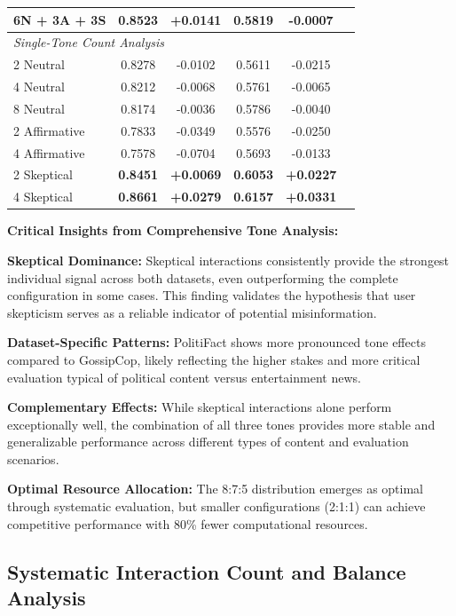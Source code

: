 \begin{table}[htbp]
\begin{tabular}{lccccc}
6N + 3A + 3S & 0.8523 & +0.0141 & 0.5819 & -0.0007 \\
\midrule
\multicolumn{5}{l}{\textit{Single-Tone Count Analysis}} \\
2 Neutral     & 0.8278 & -0.0102 & 0.5611 & -0.0215 \\
4 Neutral     & 0.8212 & -0.0068 & 0.5761 & -0.0065 \\
8 Neutral     & 0.8174 & -0.0036 & 0.5786 & -0.0040 \\ 
2 Affirmative & 0.7833 & -0.0349 & 0.5576 & -0.0250 \\
4 Affirmative & 0.7578 & -0.0704 & 0.5693 & -0.0133 \\
2 Skeptical   & \textbf{0.8451} & \textbf{+0.0069} & \textbf{0.6053} & \textbf{+0.0227} \\
4 Skeptical   & \textbf{0.8661} & \textbf{+0.0279} & \textbf{0.6157} & \textbf{+0.0331} \\
\bottomrule
\end{tabular}
\end{table}

\textbf{Critical Insights from Comprehensive Tone Analysis:}

\textbf{Skeptical Dominance:} Skeptical interactions consistently provide the strongest individual signal across both datasets, even outperforming the complete configuration in some cases. This finding validates the hypothesis that user skepticism serves as a reliable indicator of potential misinformation.

\textbf{Dataset-Specific Patterns:} PolitiFact shows more pronounced tone effects compared to GossipCop, likely reflecting the higher stakes and more critical evaluation typical of political content versus entertainment news.

\textbf{Complementary Effects:} While skeptical interactions alone perform exceptionally well, the combination of all three tones provides more stable and generalizable performance across different types of content and evaluation scenarios.

\textbf{Optimal Resource Allocation:} The 8:7:5 distribution emerges as optimal through systematic evaluation, but smaller configurations (2:1:1) can achieve competitive performance with 80\% fewer computational resources.

\subsection{Systematic Interaction Count and Balance Analysis}

